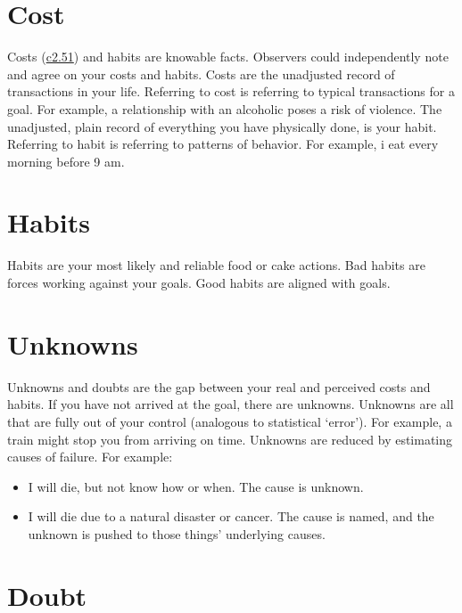 \documentclass[
]{book}
\providecommand{\tightlist}{%
  \setlength{\itemsep}{0pt}\setlength{\parskip}{0pt}}
\begin{document}
\hypertarget{cost}{%
\section{Cost}\label{cost}}

Costs (\protect\hyperlink{self-self}{c2.51}) and habits are knowable facts.
Observers could independently note and agree on your costs and habits.
Costs are the unadjusted record of transactions in your life.
Referring to cost is referring to typical transactions for a goal.
For example, a relationship with an alcoholic poses a risk of violence.
The unadjusted, plain record of everything you have physically done, is your habit.
Referring to habit is referring to patterns of behavior.
For example, i eat every morning before 9 am.

\hypertarget{habits}{%
\section{Habits}\label{habits}}

Habits are your most likely and reliable food or cake actions.
Bad habits are forces working against your goals.
Good habits are aligned with goals.

\hypertarget{unknowns}{%
\section{Unknowns}\label{unknowns}}

Unknowns and doubts are the gap between your real and perceived costs and habits.
If you have not arrived at the goal, there are unknowns.
Unknowns are all that are fully out of your control (analogous to statistical `error').
For example, a train might stop you from arriving on time.
Unknowns are reduced by estimating causes of failure.
For example:

\begin{itemize}
\tightlist
\item
  I will die, but not know how or when. The cause is unknown.\\
\item
  I will die due to a natural disaster or cancer. The cause is named, and the unknown is pushed to those things' underlying causes.
\end{itemize}

\hypertarget{doubt}{%
\section{Doubt}\label{doubt}}
\end{document}
